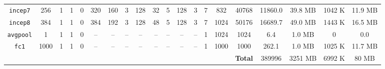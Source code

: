 \begin{table}[H]
\begin{tabular}{cccccccccccccccccccc}
        \texttt{incep7}  & 256  & 1  & 1  & 0  & 320 & 160 & 3  & 128 & 32  & 5  & 128 & 3  & 7   & \num{832}  & \num{40768}  & \num{11860.0} & \num{39.8} {\tiny MB}  & \num{1042} {\tiny K} & \num{11.9} {\tiny MB} \\
        \texttt{incep8}  & 384  & 1  & 1  & 0  & 384 & 192 & 3  & 128 & 48  & 5  & 128 & 3  & 7   & \num{1024} & \num{50176}  & \num{16689.7} & \num{49.0} {\tiny MB}  & \num{1443} {\tiny K} & \num{16.5} {\tiny MB} \\
        \cmidrule(lr){1-20}
        \texttt{avgpool} & 1    & 1  & 1  & 0  & --  & --  & -- & --  & --  & -- & --  & -- & 1   & \num{1024} & \num{1024}   & \num{6.4}     & \num{1.0} {\tiny MB}   & \num{0}              & \num{0.0}             \\
        \texttt{fc1}     & 1000 & 1  & 1  & 0  & --  & --  & -- & --  & --  & -- & --  & -- & 1   & \num{1000} & \num{1000}   & \num{262.1}   & \num{1.0} {\tiny MB}   & \num{1025} {\tiny K} & \num{11.7} {\tiny MB} \\
        \midrule
        &&&&&&&&&&&&&&& \textbf{Total} & \num{389996} & \num{3251} {\tiny MB} & \num{6992} {\tiny K} & \num{80} {\tiny MB} \\
        \bottomrule
    \end{tabular}
\end{table}